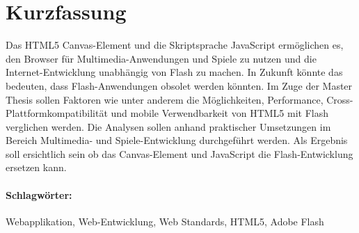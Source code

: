 \section*{Kurzfassung}\thispagestyle{empty}
Das HTML5 Canvas-Element und die Skriptsprache JavaScript ermöglichen es, den
Browser für Multimedia-Anwendungen und Spiele zu nutzen und die
Internet-Entwicklung unabhängig von Flash zu machen. In Zukunft könnte das
bedeuten, dass Flash-Anwendungen obsolet werden könnten. Im Zuge der Master
Thesis sollen Faktoren wie unter anderem die Möglichkeiten, Performance,
Cross-Plattformkompatibilität und mobile Verwendbarkeit von HTML5 mit Flash
verglichen werden. Die Analysen sollen anhand praktischer Umsetzungen im Bereich
Multimedia- und Spiele-Entwicklung durchgeführt werden. Als Ergebnis soll
ersichtlich sein ob das Canvas-Element und JavaScript die Flash-Entwicklung
ersetzen kann.
\\ \vfill
\paragraph*{Schlagwörter:} Webapplikation, Web-Entwicklung, Web Standards,
HTML5, Adobe Flash